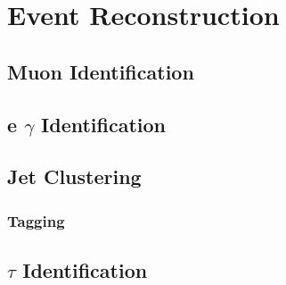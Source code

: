 \chapter{Event Reconstruction}\label{chap:reco}
	
	\section{Muon Identification}\label{sec:reco-muon}

	\section{e $\gamma$ Identification}\label{sec:reco-egamma}

	\section{Jet Clustering}\label{sec:reco-jets}

		\subsection{\bjet Tagging}\label{ssec:flavor-tagging}

	\section{$\tau$ Identification}\label{ssec:reco-tau}

	\section{\Etm}\label{sec:reco-etmiss}
		